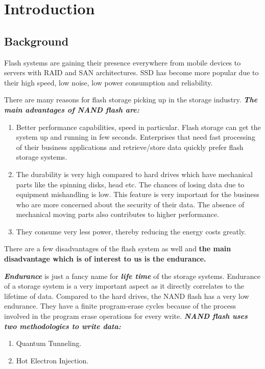 \chapter{Introduction}
\section{Background}
Flash systems are gaining their presence everywhere from mobile devices to servers with RAID and SAN architectures. SSD has become more popular due to their high speed, low noise, low power consumption and reliability. 

There are many reasons for flash storage picking up in the storage industry. 
\textbf{\textit{The main advantages of NAND flash are: }}
\begin{enumerate}

\item Better performance capabilities, speed in particular. Flash storage can get the system up and running in few seconds. Enterprises that need fast processing of their business applications and retrieve/store data quickly prefer flash storage systems. 

\item The durability is very high compared to hard drives which have mechanical parts like the spinning disks, head etc. The chances of losing data due to equipment mishandling is low. This feature is very important for the business who are more concerned about the security of their data. The absence of mechanical moving parts also contributes to higher performance. 

\item They consume very less power, thereby reducing the energy costs greatly.

\end{enumerate}
There are a few disadvantages of the flash system as well and \textbf{the main disadvantage which is of interest to us is the endurance.} 

\textbf{\textit{Endurance}} is just a fancy name for \textbf{\textit{life time}} of the storage systems. Endurance of a storage system is a very important aspect as it directly correlates to the lifetime of data. Compared to the hard drives, the NAND flash has a very low endurance. They have a finite program-erase cycles because of the process involved in the program erase operations for every write. \textbf{\textit{NAND flash uses two methodologies to write data: }} 
\begin{enumerate}

\item  Quantum Tunneling.
\item  Hot Electron Injection.
\end{enumerate}

